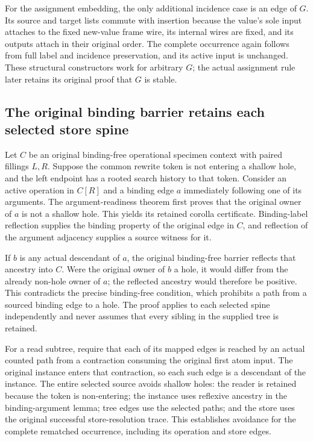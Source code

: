 For the assignment embedding, the only additional incidence case is an
edge of $G$. Its source and target lists commute with insertion because the
value's sole input attaches to the fixed new-value frame wire, its internal
wires are fixed, and its outputs attach in their original order. The complete
occurrence again follows from full label and incidence preservation, and its
active input is unchanged. These structural constructors work for arbitrary
$G$; the actual assignment rule later retains its original proof that $G$ is
stable.

\subsection{The original binding barrier retains each selected store spine}
Let $C$ be an original binding-free operational specimen context with paired
fillings $L,R$. Suppose the common rewrite token is not entering a shallow
hole, and the left endpoint has a rooted search history to that token.
Consider an active operation in $C[R]$ and a binding edge $a$ immediately
following one of its arguments. The argument-readiness theorem first proves
that the original owner of $a$ is not a shallow hole. This yields its retained
corolla certificate. Binding-label reflection supplies the binding property
of the original edge in $C$, and reflection of the argument adjacency supplies
a source witness for it.

If $b$ is any actual descendant of $a$, the original binding-free barrier
reflects that ancestry into $C$. Were the original owner of $b$ a hole, it
would differ from the already non-hole owner of $a$; the reflected ancestry
would therefore be positive. This contradicts the precise binding-free
condition, which prohibits a path from a sourced binding edge to a hole.
The proof applies to each selected spine independently and never assumes
that every sibling in the supplied tree is retained.

For a read subtree, require that each of its mapped edges is reached by
an actual counted path from a contraction consuming the original first atom
input. The original instance enters that contraction, so each such edge is
a descendant of the instance. The entire selected source avoids shallow
holes: the reader is retained because the token is non-entering; the instance
uses reflexive ancestry in the binding-argument lemma; tree edges use the
selected paths; and the store uses the original successful store-resolution
trace. This establishes avoidance for the complete rematched occurrence,
including its operation and store edges.

